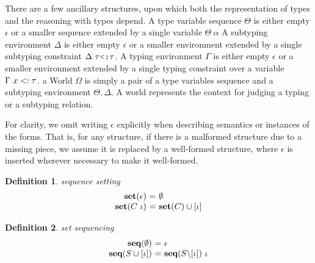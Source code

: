 \documentclass[acmsmall]{acmart}
\theoremstyle{definition}
\newtheorem{definition}{Definition}[section]
\begin{document}
There are a few ancillary structures, upon which both the representation of types and the reasoning with types depend.
A type variable sequence $\Theta$ is either empty $\epsilon$ or a smaller sequence extended by a single variable $\Theta\ \alpha$
A subtyping environment $\Delta$ is either empty $\epsilon$ or a smaller environment extended by a single
subtyping constraint $\Delta \  \tau \J{<:} \tau$.
A typing environment $\Gamma$ is either empty $\epsilon$ or a smaller environment extended by a single
typing constraint over a variable $\Gamma\ x <: \tau$.
a World $\Omega$ is simply a pair of a type variables sequence and a subtyping environment $\Theta, \Delta$.
A world represents the context for judging a typing or a subtyping relation.


For clarity, we omit writing $\epsilon$ explicitly when describing semantics or instances of the forms.
That is, for any structure, if there is a malformed structure due to a missing piece, 
we assume it is replaced by a well-formed structure, 
where $\epsilon$ is inserted wherever necessary to make it well-formed.


\begin{definition} 
  \label{def:sequence_setting}
  \emph{sequence setting}
  \hfill 
  \small
  \\
  \[
  \begin{array}[t]{r@{}c@{}l}
      \textbf{set}(\epsilon)
      &\ =\ & 
      \emptyset 

      \\

      \textbf{set}(C\ \iota)
      &\ =\ & 
      \textbf{set}(C) \cup [ \iota ] 
  \end{array}
  \]
\end{definition} 

\begin{definition} 
  \label{def:set_sequencing}
  \emph{set sequencing}
  \hfill 
  \small
  \\
  \[
  \begin{array}[t]{r@{}c@{}l}
      \textbf{seq}(\emptyset)
      &\ =\ & 
      \epsilon 

      \\

      \textbf{seq}(S \cup [\iota])
      &\ =\ & 
      \textbf{seq}(S \backslash [\iota])\ \iota 
  \end{array}
  \]
\end{definition} 
\end{document}
